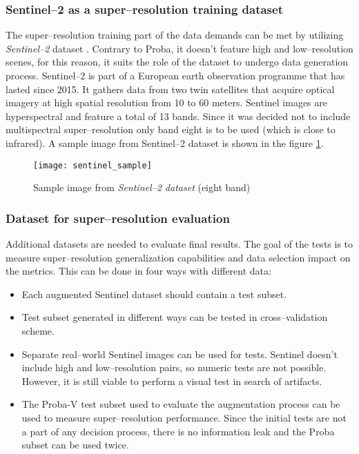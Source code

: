 \subsubsection{Sentinel--2 as a super--resolution training dataset}
The super--resolution training part of the data demands can be met by utilizing \textit{Sentinel--2} dataset \cite{esa-sentinel}.
Contrary to Proba, it doesn't feature high and low--resolution scenes, for this reason, it suits the role of the dataset to undergo data generation process.
Sentinel--2 is part of a European earth observation programme that has lasted since 2015.
It gathers data from two twin satellites that acquire optical imagery at high spatial resolution from 10 to 60 meters.
Sentinel images are hyperspectral and feature a total of 13 bands.
Since it was decided not to include multispectral super--resolution only band eight is to be used (which is close to infrared).
A sample image from Sentinel--2 dataset is shown in the figure \ref{fig:sentinel_sample}.
\begin{figure}
	\centering
    \texttt{[image: sentinel\_sample]}
    \caption{Sample image from \textit{Sentinel--2 dataset} (eight band)}
    \label{fig:sentinel_sample}
\end{figure}

\subsubsection{Dataset for super--resolution evaluation}
Additional datasets are needed to evaluate final results.
The goal of the tests is to measure super--resolution generalization capabilities and data selection impact on the metrics.
This can be done in four ways with different data:
\begin{itemize}
	\item Each augmented Sentinel dataset should contain a test subset.
	\item Test subset generated in different ways can be tested in cross--validation scheme.
	\item Separate real--world Sentinel images can be used for tests. Sentinel doesn't include high and low--resolution pairs, so numeric tests are not possible. However, it is still viable to perform a visual test in search of artifacts.
	\item The Proba-V test subset used to evaluate the augmentation process can be used to measure super--resolution performance. Since the initial tests are not a part of any decision process, there is no information leak and the Proba subset can be used twice.
\end{itemize}

